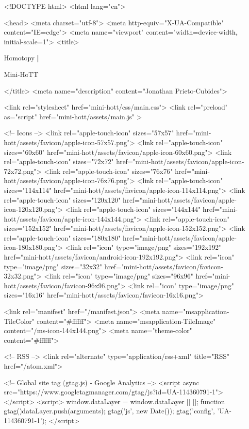 <!DOCTYPE html>
<html lang="en">

<head>
  <meta charset="utf-8">
  <meta http-equiv="X-UA-Compatible" content="IE=edge">
  <meta name="viewport" content="width=device-width, initial-scale=1">
  <title>
    
      
        Homotopy |
      
        Mini-HoTT
    
  </title>
  <meta name="description" content="Jonathan Prieto-Cubides">

  <link rel="stylesheet" href="mini-hott/css/main.css">
  <link rel="preload" as="script" href="mini-hott/assets/main.js" >

  <!-- Icons -->
  <link rel="apple-touch-icon" sizes="57x57" href="mini-hott/assets/favicon/apple-icon-57x57.png">
  <link rel="apple-touch-icon" sizes="60x60" href="mini-hott/assets/favicon/apple-icon-60x60.png">
  <link rel="apple-touch-icon" sizes="72x72" href="mini-hott/assets/favicon/apple-icon-72x72.png">
  <link rel="apple-touch-icon" sizes="76x76" href="mini-hott/assets/favicon/apple-icon-76x76.png">
  <link rel="apple-touch-icon" sizes="114x114" href="mini-hott/assets/favicon/apple-icon-114x114.png">
  <link rel="apple-touch-icon" sizes="120x120" href="mini-hott/assets/favicon/apple-icon-120x120.png">
  <link rel="apple-touch-icon" sizes="144x144" href="mini-hott/assets/favicon/apple-icon-144x144.png">
  <link rel="apple-touch-icon" sizes="152x152" href="mini-hott/assets/favicon/apple-icon-152x152.png">
  <link rel="apple-touch-icon" sizes="180x180" href="mini-hott/assets/favicon/apple-icon-180x180.png">
  <link rel="icon" type="image/png" sizes="192x192"  href="mini-hott/assets/favicon/android-icon-192x192.png">
  <link rel="icon" type="image/png" sizes="32x32" href="mini-hott/assets/favicon/favicon-32x32.png">
  <link rel="icon" type="image/png" sizes="96x96" href="mini-hott/assets/favicon/favicon-96x96.png">
  <link rel="icon" type="image/png" sizes="16x16" href="mini-hott/assets/favicon/favicon-16x16.png">

  <link rel="manifest" href="/manifest.json">
  <meta name="msapplication-TileColor" content="#ffffff">
  <meta name="msapplication-TileImage" content="/ms-icon-144x144.png">
  <meta name="theme-color" content="#ffffff">

  <!-- RSS -->
  <link rel="alternate" type="application/rss+xml" title="RSS" href="/atom.xml">

  <!-- Global site tag (gtag.js) - Google Analytics -->
  <script async src="https://www.googletagmanager.com/gtag/js?id=UA-114360791-1"></script>
  <script>
    window.dataLayer = window.dataLayer || [];
    function gtag(){dataLayer.push(arguments);}
    gtag('js', new Date());
    gtag('config', 'UA-114360791-1');
  </script>

